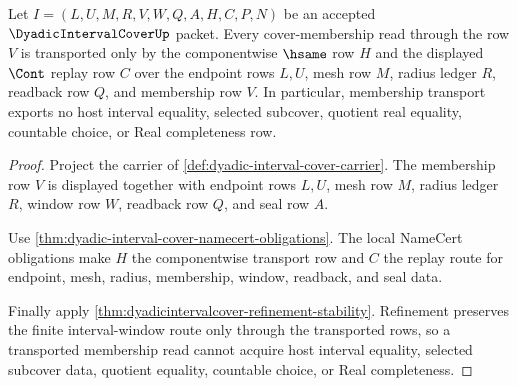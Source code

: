 \begin{theorem}
\label{thm:dyadic-interval-cover-membership-transport}
Let $I=(L,U,M,R,V,W,Q,A,H,C,P,N)$ be an accepted $\DyadicIntervalCoverUp$ packet. Every cover-membership read through the row $V$ is transported only by the componentwise $\hsame$ row $H$ and the displayed $\Cont$ replay row $C$ over the endpoint rows $L,U$, mesh row $M$, radius ledger $R$, readback row $Q$, and membership row $V$. In particular, membership transport exports no host interval equality, selected subcover, quotient real equality, countable choice, or Real completeness row.
\end{theorem}
\begin{proof}
Project the carrier of \autoref{def:dyadic-interval-cover-carrier}. The membership row $V$ is displayed together with endpoint rows $L,U$, mesh row $M$, radius ledger $R$, window row $W$, readback row $Q$, and seal row $A$.

Use \autoref{thm:dyadic-interval-cover-namecert-obligations}. The local NameCert obligations make $H$ the componentwise transport row and $C$ the replay route for endpoint, mesh, radius, membership, window, readback, and seal data.

Finally apply \autoref{thm:dyadicintervalcover-refinement-stability}. Refinement preserves the finite interval-window route only through the transported rows, so a transported membership read cannot acquire host interval equality, selected subcover data, quotient equality, countable choice, or Real completeness.
\end{proof}


